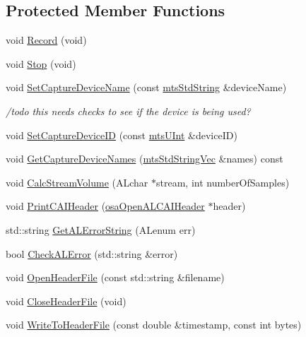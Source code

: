 \subsection*{Protected Member Functions}
\begin{DoxyCompactItemize}
\item 
void \hyperlink{classmts_open_a_l_record_a94fc75ab447960990767227c7c86a0fd}{Record} (void)
\item 
void \hyperlink{classmts_open_a_l_record_a6d54a48f9f78be6796632ced51aac3cc}{Stop} (void)
\item 
void \hyperlink{classmts_open_a_l_record_a1bd95a51a00ef828d504b7ee075f414c}{Set\+Capture\+Device\+Name} (const \hyperlink{mts_generic_object_proxy_8h_adbc21bfbf98367e582bf8a263b7e711f}{mts\+Std\+String} \&device\+Name)
\begin{DoxyCompactList}\small\item\em /todo this needs checks to see if the device is being used? \end{DoxyCompactList}\item 
void \hyperlink{classmts_open_a_l_record_a30449d511adcb2bd8232693e2e55502a}{Set\+Capture\+Device\+I\+D} (const \hyperlink{mts_generic_object_proxy_8h_aa17aa0caae80dcf94844f2bd9942adba}{mts\+U\+Int} \&device\+I\+D)
\item 
void \hyperlink{classmts_open_a_l_record_aa83b5cf8e8264a5a82543982031e3c37}{Get\+Capture\+Device\+Names} (\hyperlink{mts_vector_8h_accf55f170c81d5578af841b3adeaf24e}{mts\+Std\+String\+Vec} \&names) const 
\item 
void \hyperlink{classmts_open_a_l_record_aa5648303f30fa54768c73eba92ce1078}{Calc\+Stream\+Volume} (A\+Lchar $\ast$stream, int number\+Of\+Samples)
\item 
void \hyperlink{classmts_open_a_l_record_adaa713cebec6e3ef881fda1c253c077f}{Print\+C\+A\+I\+Header} (\hyperlink{structosa_open_a_l_c_a_i_header}{osa\+Open\+A\+L\+C\+A\+I\+Header} $\ast$header)
\item 
std\+::string \hyperlink{classmts_open_a_l_record_a67969fa07e4a4b9f4296b5a87a778713}{Get\+A\+L\+Error\+String} (A\+Lenum err)
\item 
bool \hyperlink{classmts_open_a_l_record_a268351553e0ac70e92bf1186f68e7485}{Check\+A\+L\+Error} (std\+::string \&error)
\item 
void \hyperlink{classmts_open_a_l_record_a8c614504fcc551de4fdff600489fb346}{Open\+Header\+File} (const std\+::string \&filename)
\item 
void \hyperlink{classmts_open_a_l_record_a672e1d4baff68d8b92e5f349db4389ad}{Close\+Header\+File} (void)
\item 
void \hyperlink{classmts_open_a_l_record_a03ddab803a649ff0e4aaaa9076d25959}{Write\+To\+Header\+File} (const double \&timestamp, const int bytes)
\end{DoxyCompactItemize}
